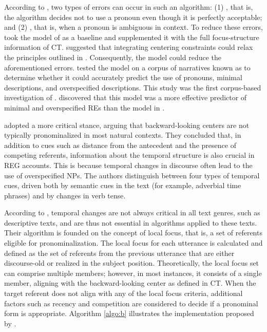 According to \citet{reiter2000building}, two types of errors can occur in such an algorithm: (1) , that is, the algorithm decides not to use a pronoun even though it is perfectly acceptable; and (2) , that is, when a pronoun is ambiguous in context. To reduce these errors, \citet{passonneau1996using} took the model of \citet{Dale1992} as a baseline and supplemented it with the full focus-structure information of CT. \citeauthor{passonneau1996using} suggested that integrating centering constraints could relax the principles outlined in \citet{Dale1992}. Consequently, the model could reduce the aforementioned errors. \citet{passonneau1996using} tested the model on a corpus of narratives known as  \citep{pearstories} to determine whether it could accurately predict the use of pronouns, minimal descriptions, and overspecified descriptions. This study was the first corpus-based investigation of \context \citep{viethen2011generation}. \citeauthor{passonneau1996using} discovered that this model was a more effective predictor of minimal and overspecified REs than the model in \citet{Dale1992}.

\citet{mccoy1999generating} adopted a more critical stance, arguing that backward-looking centers are not typically pronominalized in most natural contexts. They concluded that, in addition to cues such as distance from the antecedent and the presence of competing referents, information about the temporal structure is also crucial in REG accounts. This is because temporal changes in discourse often lead to the use of overspecified NPs. The authors distinguish between four types of temporal cues, driven both by semantic cues in the text (for example, adverbial time phrases) and by changes in verb tense.

According to \citet{henschel2000pronominalization}, temporal changes are not always critical in all text genres, such as descriptive texts, and are thus not essential in algorithms applied to these texts. Their algorithm is founded on the concept of local focus, that is, a set of referents eligible for pronominalization. The local focus for each utterance is calculated and defined as the set of referents from the previous utterance that are either discourse-old or realized in the subject position. Theoretically, the local focus set can comprise multiple members; however, in most instances, it consists of a single member, aligning with the backward-looking center as defined in CT. When the target referent does not align with any of the local focus criteria, additional factors such as recency and competition are considered to decide if a pronominal form is appropriate. Algorithm \ref{algo:b} illustrates the implementation proposed by \citet{henschel2000pronominalization}.

